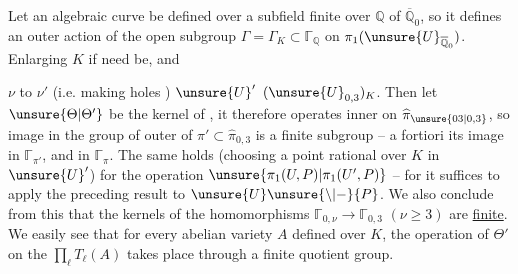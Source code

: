 Let an algebraic curve  be defined over a subfield  finite over $\mathbb Q$ of $\overline{\mathbb Q}_0$, so it defines an outer action of the open subgroup $\Gamma=\Gamma_K\subset\mathbb{\Gamma}_{\mathbb Q}$ on $\pi_1(\unsure{U}_{\overline{\mathbb Q}_0})$.  Enlarging $K$ if need be,  and 


$\nu$ to $\nu'$ (i.e. making holes )  $\unsure{U}'$   $(\unsure{U}_{0,3})_K$.
 
Then let $\unsure{\Theta|\Theta'}$ be the kernel of
,
it therefore operates  inner  on $\widehat{\pi}_{\unsure{03|0,3}}$, so  image  in the group of outer  of $\pi'\subset\widehat{\pi}_{0,3}$ is a finite subgroup -- a fortiori its image in $\mathbb{\Gamma}_{\pi'}$, and in  $\mathbb{\Gamma}_{\pi}$. The same holds (choosing a  point rational over $K$ in $\unsure{U}'$) for the  operation  $\unsure{\pi_1(U,P)|\pi_1(U',P)}$ -- for it suffices to apply the preceding result to $\unsure{U}\unsure{\backslash|-}\{P\}$. We also conclude from this that  the kernels of the homomorphisms $\mathbb{\Gamma}_{0,\nu}\longrightarrow\mathbb{\Gamma}_{0,3}$ $(\nu\geq3)$ are \uline{finite}. We easily see that for every abelian variety $A$ defined over $K$, the operation of $\Theta'$ on the $\prod_\ell T_\ell(A)$ takes place through a finite quotient group.

